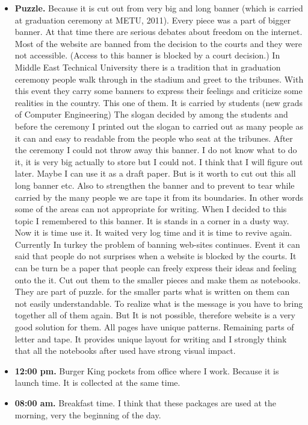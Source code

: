 \begin{itemize}
\item \textbf{Puzzle.} Because it is cut out from very big and long banner (which is carried at graduation ceremony at METU, 2011). Every piece was a part of bigger banner. At that time there are serious debates about freedom on the internet. Most of the website are banned from the decision to the courts and they were not accessible. (Access to this banner is blocked by a court decision.) In Middle East Technical University there is a tradition that in graduation ceremony people walk through in the stadium and greet to the tribunes. With this event they carry some banners to express their feelings and criticize some realities in the country. This one of them. It is carried by students (new grads of Computer Engineering) The slogan decided by among the students and before the ceremony I printed out the slogan to carried out as many people as it can and easy to readable from the people who seat at the tribunes. After the ceremony I could not throw away this banner. I do not know what to do it, it is very big actually to store but I could not. I think that I will figure out later. Maybe I can use it as a draft paper. But is it worth to cut out this all long banner etc. Also to strengthen the banner and to prevent to tear while carried by the many people we are tape it from its boundaries. In other words some of the areas can not appropriate for writing. When I decided to this topic I remembered to this banner. It is stands in a corner in a dusty way. Now it is time use it. It waited very log time and it is time to revive again. Currently In turkey the problem of banning web-sites continues. Event it can said that people do not surprises when a website is blocked by the courts. It can be turn be a paper that people can freely express their ideas and feeling onto the it. Cut out them to the smaller pieces and make them as notebooks. They are part of puzzle. for the smaller parts what is written on them can not easily understandable. To realize what is the message is you have to bring together all of them again. But It is not possible, therefore website is a very good solution for them. All pages have unique patterns. Remaining parts of letter and tape. It provides unique layout for writing and I strongly think that all the notebooks after used have strong visual impact. 
\item \textbf{12:00 pm.} Burger King pockets from office where I work. Because it is launch time. It is collected at the same time.
\item \textbf{08:00 am.} Breakfast time. I think that these packages are used at the morning, very the beginning of the day.

\end{itemize}
